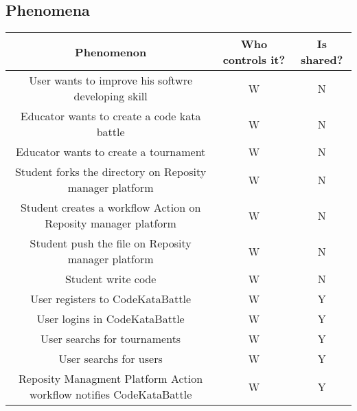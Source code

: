 \subsection{Phenomena}
\begin{center}
    \begin{table}[h]
        \begin{tabularx}{\textwidth}{| c| c| c|}
            \hline
            \rowcolor{blue!50}
            Phenomenon                                                            & Who controls it? & Is shared? \\
            \hline
            User wants to improve his softwre developing skill                    & W                & N          \\
            Educator wants to create a code kata battle                           & W                & N          \\
            Educator wants to create a tournament                                 & W                & N          \\
            Student forks the directory on Reposity manager platform                              & W                & N          \\
            Student creates a workflow Action on Reposity manager platform                           & W                & N          \\
            Student push the file on Reposity manager platform                            & W                & N          \\
            Student write code                                                    & W                & N          \\
            User registers to CodeKataBattle                                      & W                & Y          \\
            User logins in CodeKataBattle                                         & W                & Y          \\
            User searchs for tournaments                                          & W                & Y          \\
            User searchs for users                                                & W                & Y          \\
            Reposity Managment Platform Action workflow notifies CodeKataBattle                        & W                & Y          \\

\end{tabularx}
\end{table}
\end{center}
